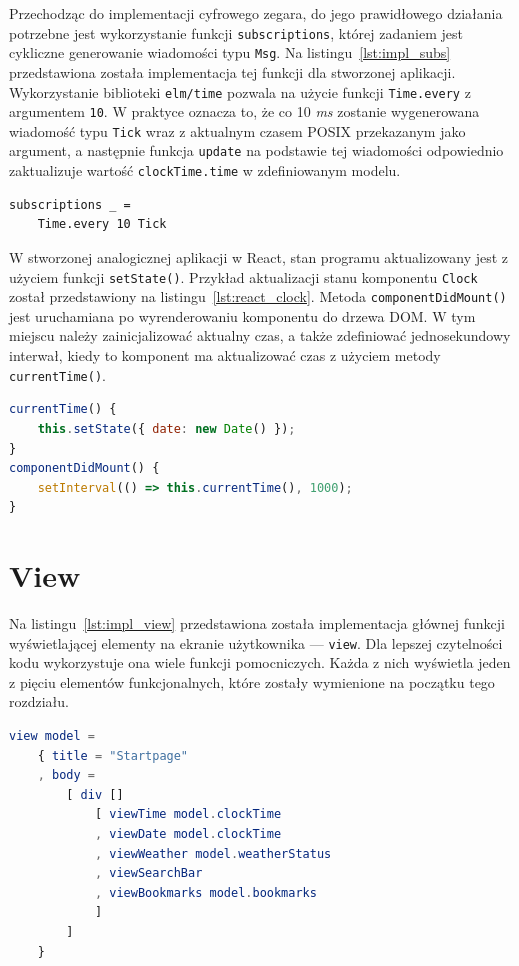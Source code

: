 \documentclass[twoside,a4paper]{report}
\begin{document}
Przechodząc do implementacji cyfrowego zegara, do jego prawidłowego działania potrzebne jest wykorzystanie funkcji \texttt{subscriptions}, której zadaniem jest cykliczne generowanie wiadomości typu \texttt{Msg}.
Na listingu~\ref{lst:impl_subs} przedstawiona została implementacja tej funkcji dla stworzonej aplikacji.
Wykorzystanie biblioteki \texttt{elm/time} pozwala na użycie funkcji \texttt{Time.every} z argumentem \texttt{10}.
W praktyce oznacza to, że co 10 \textit{ms} zostanie wygenerowana wiadomość typu \texttt{Tick} wraz z aktualnym czasem POSIX przekazanym jako argument, a następnie funkcja \texttt{update} na podstawie tej wiadomości odpowiednio zaktualizuje wartość \texttt{clockTime.time} w zdefiniowanym modelu.

\begin{lstlisting}[mathescape,caption={Implementacja funkcji \texttt{subscriptions}},label={lst:impl_subs}]
subscriptions _ =
    Time.every 10 Tick
\end{lstlisting}

W stworzonej analogicznej aplikacji w React, stan programu aktualizowany jest z użyciem funkcji \texttt{setState()}.
Przykład aktualizacji stanu komponentu \texttt{Clock} został przedstawiony na listingu~\ref{lst:react_clock}.
Metoda \texttt{componentDidMount()} jest uruchamiana po wyrenderowaniu komponentu do drzewa DOM\@.
W tym miejscu należy zainicjalizować aktualny czas, a także zdefiniować jednosekundowy interwał, kiedy to komponent ma aktualizować czas z użyciem metody \texttt{currentTime()}.

\begin{lstlisting}[caption={Aktualizacja czasu w komponencie \texttt{Clock}},label={lst:react_clock},language={JavaScript}]
currentTime() {
    this.setState({ date: new Date() });
}
componentDidMount() {
    setInterval(() => this.currentTime(), 1000);
}
\end{lstlisting}



\section{View}
Na listingu~\ref{lst:impl_view} przedstawiona została implementacja głównej funkcji wyświetlającej elementy na ekranie użytkownika --- \texttt{view}.
Dla lepszej czytelności kodu wykorzystuje ona wiele funkcji pomocniczych.
Każda z nich wyświetla jeden z pięciu elementów funkcjonalnych, które zostały wymienione na początku tego rozdziału.
\begin{lstlisting}[mathescape,caption={Implementacja funkcji \texttt{view}},label={lst:impl_view},language={Elm}]
view model =
    { title = "Startpage"
    , body =
        [ div []
            [ viewTime model.clockTime
            , viewDate model.clockTime
            , viewWeather model.weatherStatus
            , viewSearchBar
            , viewBookmarks model.bookmarks
            ]
        ]
    }
\end{lstlisting}
\end{document}
